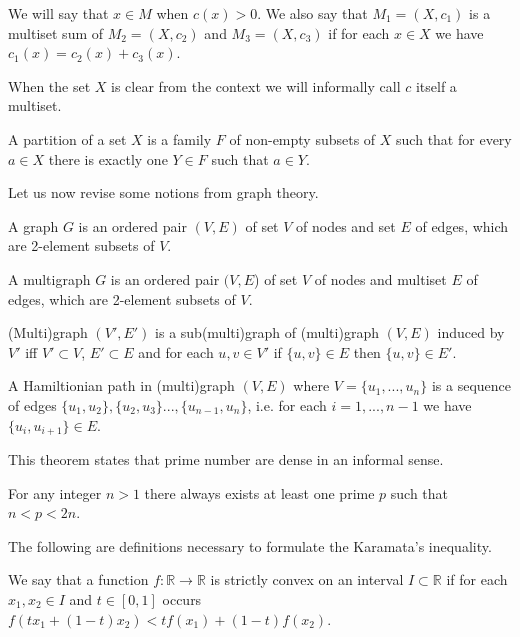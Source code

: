 We will say that $x \in M$ when $c(x) > 0$.
We also say that $M_1 = (X, c_1)$ is a multiset sum of $M_2 = (X, c_2)$ and $M_3 = (X, c_3)$
if for each $x \in X$ we have $c_1(x) = c_2(x) + c_3(x)$.

When the set $X$ is clear from the context we will informally call $c$ itself a multiset.

\begin{defn}
A partition of a set $X$ is a family $F$ of non-empty subsets of $X$
such that for every $a \in X$ there is exactly one $Y \in F$ such that $a \in Y$.
\end{defn}

Let us now revise some notions from graph theory.

\begin{defn}[graph]
A graph $G$ is an ordered pair $(V,E)$ of set $V$ of nodes
and set $E$ of edges, which are 2-element subsets of $V$.
\end{defn}

\begin{defn}[multigraph]
A multigraph $G$ is an ordered pair $(V,E$) of set $V$ of nodes
and multiset $E$ of edges, which are 2-element subsets of $V$.
\end{defn}

\begin{defn}
(Multi)graph $(V', E')$ is a sub(multi)graph of (multi)graph $(V,E)$ induced by $V'$
iff $V' \subset V$, $E' \subset E$ and for each $u,v \in V'$ if $\{u,v\}\in E$ then $\{u,v\}\in E'$.
\end{defn}

\begin{defn}
A Hamiltionian path in (multi)graph $(V,E)$ where $V = \{u_1, ..., u_n\}$
is a sequence of edges $\{u_1, u_2\}, \{u_2, u_3\} ..., \{u_{n-1}, u_n\}$,
i.e. for each $i=1,...,n-1$ we have $\{u_i, u_{i+1}\} \in E$.
\end{defn}


This theorem states that prime number are dense in an informal sense.

\begin{thm}
For any integer $n>1$ there always exists at least one prime $p$ such that $n < p < 2n$.
\end{thm}


The following are definitions necessary to formulate the Karamata's inequality.

\begin{defn}
We say that a function $f:\mathbb{R}\rightarrow\mathbb{R}$ is strictly convex on an interval $I \subset \mathbb{R}$
if for each $x_1, x_2 \in I$ and $t \in [0,1]$ occurs $f(t x_1 + (1-t) x_2) < tf(x_1) + (1-t)f(x_2)$.
\end{defn}

